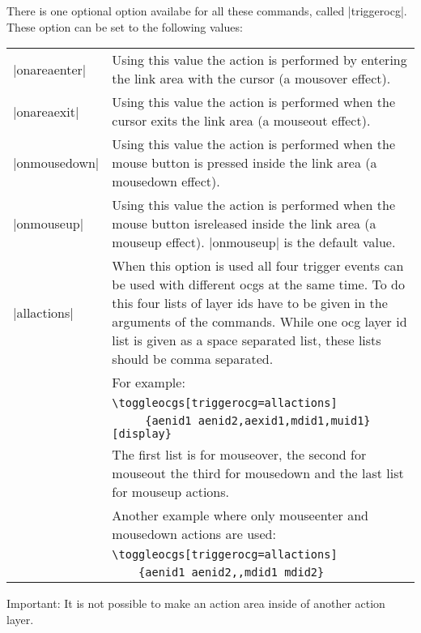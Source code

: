 \documentclass[a4paper]{ltxdoc}
\begin{document}
There is one optional option availabe for all these commands, called |triggerocg|. These option can be set to the following values:
\begin{center}\begin{tabular}{lp{9cm}}\hline
|onareaenter| & Using this value the action is performed by entering the link area with the cursor (a mousover effect).\\
|onareaexit| & Using this value the action is performed when the cursor exits the link area (a mouseout effect).\\
|onmousedown| & Using this value the action is performed when the mouse button is pressed inside the link area (a mousedown effect).\\
|onmouseup| & Using this value the action is performed when the mouse button isreleased inside the link area (a mouseup effect). |onmouseup| is the default value.\\
|allactions| & When this option is used all four trigger events can be used with different ocgs at the same time. To do this four lists of layer ids have to be given in the arguments of the commands. While one ocg layer id list is given as a space separated list, these lists should be comma separated.\\
& For example:\\
& \verb+\toggleocgs[triggerocg=allactions]+\\ & \verb+     {aenid1 aenid2,aexid1,mdid1,muid1}[display}+ \\
& The first list is for mouseover, the second for mouseout the third for mousedown and the last list for mouseup actions.\\
& Another example where only mouseenter and mousedown actions are used:\\
& \verb+\toggleocgs[triggerocg=allactions]+\\ & \verb+    {aenid1 aenid2,,mdid1 mdid2}+\\
\hline
\end{tabular}\end{center}

Important: It is not possible to make an action area inside of another action layer.

\newpage
\end{document}
